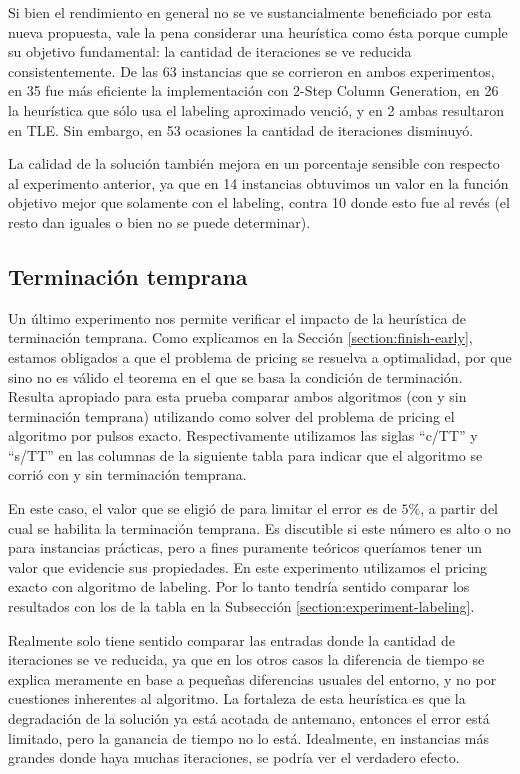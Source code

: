 Si bien el rendimiento en general no se ve sustancialmente beneficiado por esta nueva propuesta, vale la pena considerar una heurística como ésta porque cumple su objetivo fundamental: la cantidad de iteraciones se ve reducida consistentemente. De las 63 instancias que se corrieron en ambos experimentos, en 35 fue más eficiente la implementación con 2-Step Column Generation, en 26 la heurística que sólo usa el labeling aproximado venció, y en 2 ambas resultaron en TLE. Sin embargo, en 53 ocasiones la cantidad de iteraciones disminuyó.

La calidad de la solución también mejora en un porcentaje sensible con respecto al experimento anterior, ya que en 14 instancias obtuvimos un valor en la función objetivo mejor que solamente con el labeling, contra 10 donde esto fue al revés (el resto dan iguales o bien no se puede determinar).


\subsection{Terminación temprana}

Un último experimento nos permite verificar el impacto de la heurística de terminación temprana. Como explicamos en la Sección \ref{section:finish-early}, estamos obligados a que el problema de pricing se resuelva a optimalidad, por que sino no es válido el teorema en el que se basa la condición de terminación. Resulta apropiado para esta prueba comparar ambos algoritmos (con y sin terminación temprana) utilizando como solver del problema de pricing el algoritmo por pulsos exacto. Respectivamente utilizamos las siglas ``c/TT'' y ``s/TT'' en las columnas de la siguiente tabla para indicar que el algoritmo se corrió con y sin terminación temprana. 

En este caso, el valor que se eligió de para limitar el error es de $5\%$, a partir del cual se habilita la terminación temprana. Es discutible si este número es alto o no para instancias prácticas, pero a fines puramente teóricos queríamos tener un valor que evidencie sus propiedades. En este experimento utilizamos el pricing exacto con algoritmo de labeling. Por lo tanto tendría sentido comparar los resultados con los de la tabla en la Subsección \ref{section:experiment-labeling}.

Realmente solo tiene sentido comparar las entradas donde la cantidad de iteraciones se ve reducida, ya que en los otros casos la diferencia de tiempo se explica meramente en base a pequeñas diferencias usuales del entorno, y no por cuestiones inherentes al algoritmo. La fortaleza de esta heurística es que la degradación de la solución ya está acotada de antemano, entonces el error está limitado, pero la ganancia de tiempo no lo está. Idealmente, en instancias más grandes donde haya muchas iteraciones, se podría ver el verdadero efecto.

